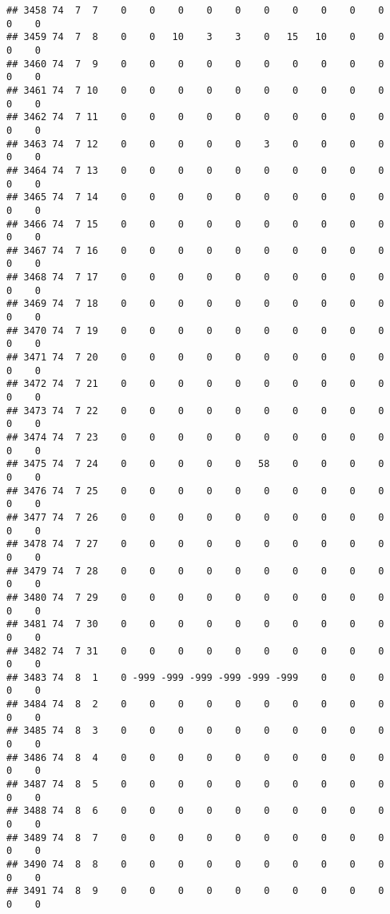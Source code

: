 \documentclass[]{article}
\begin{document}
\begin{verbatim}
## 3458 74  7  7    0    0    0    0    0    0    0    0    0    0    0    0
## 3459 74  7  8    0    0   10    3    3    0   15   10    0    0    0    0
## 3460 74  7  9    0    0    0    0    0    0    0    0    0    0    0    0
## 3461 74  7 10    0    0    0    0    0    0    0    0    0    0    0    0
## 3462 74  7 11    0    0    0    0    0    0    0    0    0    0    0    0
## 3463 74  7 12    0    0    0    0    0    3    0    0    0    0    0    0
## 3464 74  7 13    0    0    0    0    0    0    0    0    0    0    0    0
## 3465 74  7 14    0    0    0    0    0    0    0    0    0    0    0    0
## 3466 74  7 15    0    0    0    0    0    0    0    0    0    0    0    0
## 3467 74  7 16    0    0    0    0    0    0    0    0    0    0    0    0
## 3468 74  7 17    0    0    0    0    0    0    0    0    0    0    0    0
## 3469 74  7 18    0    0    0    0    0    0    0    0    0    0    0    0
## 3470 74  7 19    0    0    0    0    0    0    0    0    0    0    0    0
## 3471 74  7 20    0    0    0    0    0    0    0    0    0    0    0    0
## 3472 74  7 21    0    0    0    0    0    0    0    0    0    0    0    0
## 3473 74  7 22    0    0    0    0    0    0    0    0    0    0    0    0
## 3474 74  7 23    0    0    0    0    0    0    0    0    0    0    0    0
## 3475 74  7 24    0    0    0    0    0   58    0    0    0    0    0    0
## 3476 74  7 25    0    0    0    0    0    0    0    0    0    0    0    0
## 3477 74  7 26    0    0    0    0    0    0    0    0    0    0    0    0
## 3478 74  7 27    0    0    0    0    0    0    0    0    0    0    0    0
## 3479 74  7 28    0    0    0    0    0    0    0    0    0    0    0    0
## 3480 74  7 29    0    0    0    0    0    0    0    0    0    0    0    0
## 3481 74  7 30    0    0    0    0    0    0    0    0    0    0    0    0
## 3482 74  7 31    0    0    0    0    0    0    0    0    0    0    0    0
## 3483 74  8  1    0 -999 -999 -999 -999 -999 -999    0    0    0    0    0
## 3484 74  8  2    0    0    0    0    0    0    0    0    0    0    0    0
## 3485 74  8  3    0    0    0    0    0    0    0    0    0    0    0    0
## 3486 74  8  4    0    0    0    0    0    0    0    0    0    0    0    0
## 3487 74  8  5    0    0    0    0    0    0    0    0    0    0    0    0
## 3488 74  8  6    0    0    0    0    0    0    0    0    0    0    0    0
## 3489 74  8  7    0    0    0    0    0    0    0    0    0    0    0    0
## 3490 74  8  8    0    0    0    0    0    0    0    0    0    0    0    0
## 3491 74  8  9    0    0    0    0    0    0    0    0    0    0    0    0

\end{verbatim}
\end{document}
